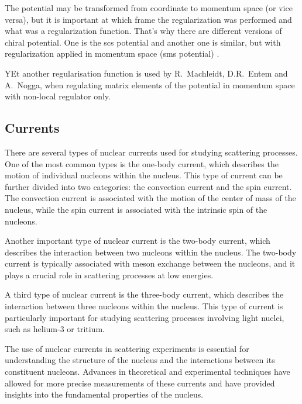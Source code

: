 The potential may be transformed from coordinate to momentum space (or vice versa),
but it is important at which frame the regularization was performed
and what was a regularization function. That's why there are different 
versions of chiral potential. One is the \gls{scs} potential \cite{Epelbaum2014SCS}
and another one is similar, but with regularization applied in momentum space (\gls{sms} potential) \cite{reinkrebs2018}.

YEt another regularisation function  is used by R.~Machleidt, D.R.~Entem and A.~Nogga, 
when regulating matrix elements of the potential in momentum space with non-local regulator only.

\subsection*{Currents}
 
There are several types of nuclear currents used for studying scattering processes. One of the most common types is the one-body current, which describes the motion of individual nucleons within the nucleus. This type of current can be further divided into two categories: the convection current and the spin current. The convection current is associated with the motion of the center of mass of the nucleus, while the spin current is associated with the intrinsic spin of the nucleons.

Another important type of nuclear current is the two-body current, which describes the interaction between two nucleons within the nucleus. The two-body current is typically associated with meson exchange between the nucleons, and it plays a crucial role in scattering processes at low energies.

A third type of nuclear current is the three-body current, which describes the interaction between three nucleons within the nucleus. This type of current is particularly important for studying scattering processes involving light nuclei, such as helium-3 or tritium.

The use of nuclear currents in scattering experiments is essential for understanding the structure of the nucleus and the interactions between its constituent nucleons. Advances in theoretical and experimental techniques have allowed for more precise measurements of these currents and have provided insights into the fundamental properties of the nucleus.

